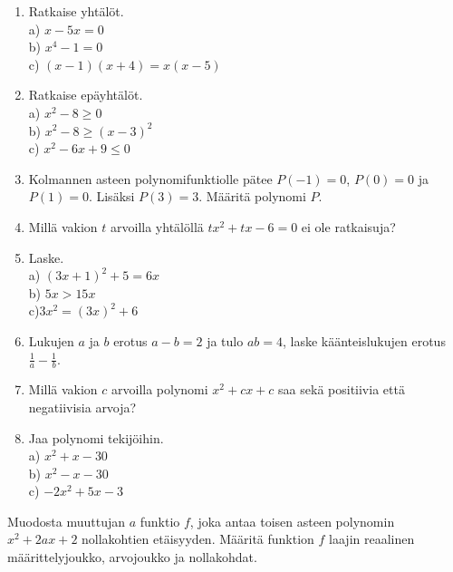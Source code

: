 \begin{enumerate}
\item Ratkaise yhtälöt.\\ a) $x-5x=0$\\ b) $x^4-1=0$\\ c) $(x-1)(x+4) = x(x-5)$
\item Ratkaise epäyhtälöt.\\ a) $x^2-8\geq0$\\ b) $x^2-8\geq(x-3)^2$\\ c) $x^2-6x+9\leq0$
\item Kolmannen asteen polynomifunktiolle pätee $P(-1)=0$, $P(0)=0$ ja $P(1)=0$. Lisäksi $P(3)=3$. Määritä polynomi $P$.
\item Millä vakion $t$ arvoilla yhtälöllä $tx^2+tx-6=0$ ei ole ratkaisuja?
\item Laske. \\ a) $(3x+1)^2+5=6x$\\ b) $5x>15x$\\ c)$3x^2=(3x)^2+6$ 
\item Lukujen $a$ ja $b$ erotus $a-b=2$ ja tulo $ab=4$, laske käänteislukujen erotus $\frac{1}{a}-\frac{1}{b}$.
\item Millä vakion $c$ arvoilla polynomi $x^2+cx+c$ saa sekä positiivia että negatiivisia arvoja?
\item Jaa polynomi tekijöihin.\\ a) $x^2+x-30$\\ b)  $x^2-x-30$\\ c)  $-2x^2+5x-3$ 
\end{enumerate}

\begin{tehtava}
	\begin{alakohdat}
	\end{alakohdat}
	\begin{vastaus}
		\begin{alakohdat}
	\end{alakohdat}
	\end{vastaus}
\end{tehtava}

\begin{tehtava}
Muodosta muuttujan $a$ funktio $f$, joka antaa toisen asteen polynomin $x^2+2ax+2$ nollakohtien etäisyyden. Määritä funktion $f$ laajin reaalinen määrittelyjoukko, arvojoukko ja nollakohdat.
\end{tehtava}

